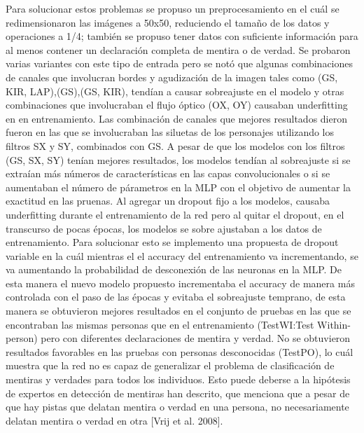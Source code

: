\begin{onehalfspacing}
Para solucionar estos problemas se propuso un preprocesamiento en el cuál se redimensionaron las imágenes a 50x50, reduciendo el tamaño de los datos y operaciones a 1/4; también se propuso tener datos con suficiente información para al menos contener un declaración completa de mentira o de verdad. Se probaron varias variantes con este tipo de entrada pero se notó que algunas combinaciones de canales que involucran bordes y agudización de la imagen tales como (GS, KIR, LAP),(GS),(GS, KIR), tendían a causar sobreajuste en el modelo y otras combinaciones que involucraban el flujo óptico (OX, OY) causaban underfitting en en entrenamiento. Las combinación de canales que mejores resultados dieron fueron en las que se involucraban las siluetas de los personajes utilizando los filtros SX y SY, combinados con GS. A pesar de que los modelos con los filtros (GS, SX, SY) tenían mejores resultados, los modelos tendían al sobreajuste si se extraían más números de características en las capas convolucionales o si se aumentaban el número de párametros en la MLP con el objetivo de aumentar la exactitud en las pruenas. Al agregar un dropout fijo a los modelos, causaba underfitting durante el entrenamiento de la red pero al quitar el dropout, en el transcurso de pocas épocas, los modelos se sobre ajustaban a los datos de entrenamiento. Para solucionar esto se implemento una propuesta de dropout variable en la cuál mientras el el accuracy del entrenamiento va incrementando, se va aumentando la probabilidad de desconexión de las neuronas en la MLP. De esta manera el nuevo modelo propuesto incrementaba el accuracy de manera más controlada con el paso de las épocas y evitaba el sobreajuste temprano, de esta manera se obtuvieron mejores resultados en el conjunto de pruebas en las que se encontraban las mismas personas que en el entrenamiento (TestWI:Test Within-person) pero con diferentes declaraciones de mentira y verdad. No se obtuvieron resultados favorables en las pruebas con personas desconocidas (TestPO), lo cuál muestra que la red no es capaz de generalizar el problema de clasificación de mentiras y verdades para todos los individuos.
Esto puede deberse a la hipótesis de expertos en detección de mentiras han descrito, que menciona que a pesar de que hay pistas que delatan mentira o verdad en una persona, no necesariamente delatan mentira o verdad en otra [Vrij et al. 2008].\\




\end{onehalfspacing}